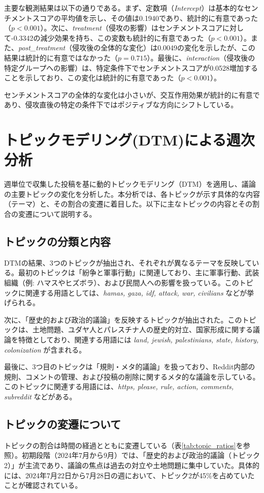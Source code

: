 \documentclass[11pt, a4j]{jreport}
\begin{document}
    主要な観測結果は以下の通りである。まず、定数項（\textit{Intercept}）は基本的なセンチメントスコアの平均値を示し、その値は0.1940であり、統計的に有意であった（$p < 0.001$）。次に、\textit{treatment}（侵攻の影響）はセンチメントスコアに対して-0.3342の減少効果を持ち、この変数も統計的に有意であった（$p < 0.001$）。また、\textit{post\_treatment}（侵攻後の全体的な変化）は0.0049の変化を示したが、この結果は統計的に有意ではなかった（$p = 0.715$）。最後に、\textit{interaction}（侵攻後の特定グループへの影響）は、特定条件下でセンチメントスコアが0.0528増加することを示しており、この変化は統計的に有意であった（$p < 0.001$）。
    
    センチメントスコアの全体的な変化は小さいが、交互作用効果が統計的に有意であり、侵攻直後の特定の条件下ではポジティブな方向にシフトしている。

    \section{トピックモデリング(DTM)による週次分析}

    週単位で収集した投稿を基に動的トピックモデリング（DTM）を適用し、議論の主要トピックの変化を分析した。本分析では、各トピックが示す具体的な内容（テーマ）と、その割合の変遷に着目した。以下に主なトピックの内容とその割合の変遷について説明する。

    \subsection{トピックの分類と内容}
    DTMの結果、3つのトピックが抽出され、それぞれが異なるテーマを反映している。最初のトピックは「紛争と軍事行動」に関連しており、主に軍事行動、武装組織（例: ハマスやヒズボラ）、および民間人への影響を扱っている。このトピックに関連する用語としては、\textit{hamas, gaza, idf, attack, war, civilians} などが挙げられる。
    
    次に、「歴史的および政治的議論」を反映するトピックが抽出された。このトピックは、土地問題、ユダヤ人とパレスチナ人の歴史的対立、国家形成に関する議論を特徴としており、関連する用語には \textit{land, jewish, palestinians, state, history, colonization} が含まれる。
    
    最後に、3つ目のトピックは「規則・メタ的議論」を扱っており、Reddit内部の規則、コメントの管理、および投稿の削除に関するメタ的な議論を示している。このトピックに関連する用語には、\textit{https, please, rule, action, comments, subreddit} などがある。

    \subsection{トピックの変遷について}
    トピックの割合は時間の経過とともに変遷している（表\ref{tab:topic_ratios}を参照）。初期段階（2024年7月から9月）では、「歴史的および政治的議論（トピック2）」が主流であり、議論の焦点は過去の対立や土地問題に集中していた。具体的には、2024年7月22日から7月28日の週において、トピック2が45\%を占めていたことが確認されている。
    
\end{document}
